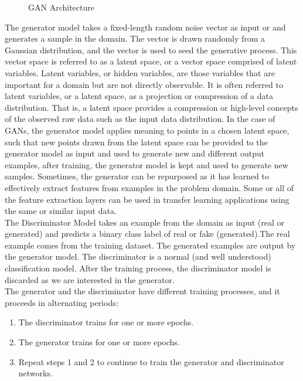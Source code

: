 \begin{figure}
	\centerline
	\GAN
	\caption{GAN Architecture}
	\label{fig:GAN}
\end{figure} 
The generator model takes a fixed-length random noise vector as input or and generates a sample in the domain. The vector is drawn randomly from a Gaussian distribution, and the vector is used to seed the generative process. This vector space is referred to as a latent space, or a vector space comprised of latent variables. Latent variables, or hidden variables, are those variables that are important for a domain but are not directly observable. It is often referred to latent variables, or a latent space, as a projection or compression of a data distribution. That is, a latent space provides a compression or high-level concepts of the observed raw data such as the input data distribution. In the case of GANs, the generator model applies meaning to points in a chosen latent space, such that new points drawn from the latent space can be provided to the generator model as input and used to generate new and different output examples, 
after training, the generator model is kept and used to generate new samples. Sometimes, the generator can be repurposed as it has learned to effectively extract features from examples in the problem domain. Some or all of the feature extraction layers can be used in transfer learning applications using the same or similar input data. \\

The Discriminator Model takes an example from the domain as input (real or generated) and predicts a binary class label of real or fake (generated).The real example comes from the training dataset. The generated examples are output by the generator model. The discriminator is a normal (and well understood) classification model. After the training process, the discriminator model is discarded as we are interested in the generator.\\
The generator and the discriminator have different training processes, and it proceeds in alternating periods:
\begin{enumerate}
	\item The discriminator trains for one or more epochs.
	\item The generator trains for one or more epochs.
	\item Repeat steps 1 and 2 to continue to train the generator and discriminator networks.
\end{enumerate}

